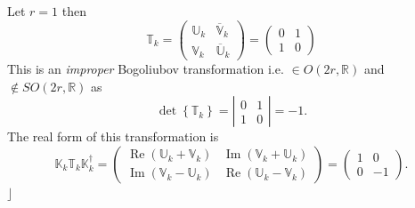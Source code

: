\documentclass[aps, preprint]{revtex4}
\begin{document}
Let $r =1$ then
\begin{equation}\mathbb{T}_{k} =\left (\begin{array}{cc}\mathbb{U}_{k} & \overline{\mathbb{V}}_{k} \\
\mathbb{V}_{k} & \overline{\mathbb{U}}_{k}\end{array}\right ) =\left (\begin{array}{cc}0 & 1 \\
1 & 0\end{array}\right )
\end{equation}This is an \emph{improper} Bogoliubov transformation i.e. $ \in O \left (2 r ,\mathbb{R}\right )$ and $ \notin S O \left (2 r ,\mathbb{R}\right )$ as
\begin{equation}\det \left \{\mathbb{T}_{k}\right \} =\left \vert \begin{array}{cc}0 & 1 \\
1 & 0\end{array}\right \vert  = -1.
\end{equation}The real form of this transformation is
\begin{equation}\mathbb{K}_{k} \mathbb{T}_{k} \mathbb{K}_{k}^{ \dag } =\left (\begin{array}{cc}\ensuremath{\operatorname*{Re}} \left (\mathbb{U}_{k} +\mathbb{V}_{k}\right ) & \ensuremath{\operatorname*{Im}} \left (\mathbb{V}_{k} +\mathbb{U}_{k}\right ) \\
\ensuremath{\operatorname*{Im}} \left (\mathbb{V}_{k} -\mathbb{U}_{k}\right ) & \ensuremath{\operatorname*{Re}} \left (\mathbb{U}_{k} -\mathbb{V}_{k}\right )\end{array}\right ) =\left (\begin{array}{cc}1 & 0 \\
0 &  -1\end{array}\right )\text{.}
\end{equation}$\rfloor $
\end{document}
